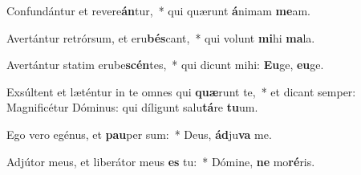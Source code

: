 \item Confundántur et revere\textbf{án}tur,~* qui quærunt \textbf{á}nimam \textbf{me}am.
\item Avertántur retrórsum, et eru\textbf{bés}cant,~* qui volunt \textbf{mi}hi \textbf{ma}la.
\item Avertántur statim erube\textbf{scén}tes,~* qui dicunt mihi: \textbf{Eu}ge, \textbf{eu}ge.
\item Exsúltent et læténtur in te omnes qui \textbf{quæ}runt te,~* et dicant semper: Magnificétur Dóminus: qui díligunt salu\textbf{tá}re \textbf{tu}um.
\item Ego vero egénus, et \textbf{pau}per sum:~* Deus, \textbf{ád}ju\textbf{va} me.
\item Adjútor meus, et liberátor meus \textbf{es} tu:~* Dómine, \textbf{ne} mo\textbf{ré}ris.
